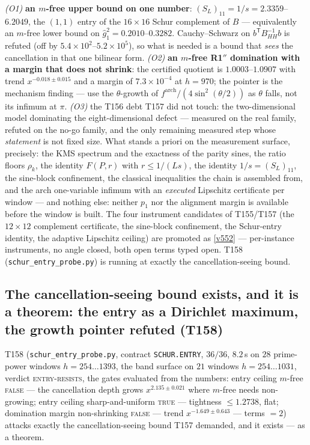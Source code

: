 \documentclass[11pt,a4paper]{article}
\begin{document}
\begin{keybox}
\emph{(O1)} \textbf{an $m$-free upper bound on one number}: $(S_L)_{11}=1/s=
2.3359$--$6.2049$, the $(1,1)$ entry of the $16\times16$ Schur complement of $B$ ---
equivalently an $m$-free lower bound on $\hat g_1^2=0.2010$--$0.3282$. Cauchy--Schwarz
on $b^{\mathsf T}B_{HH}^{-1}b$ is refuted (off by $5.4\times10^{2}$--$5.2\times10^{5}$),
so what is needed is a bound that \emph{sees} the cancellation in that one bilinear
form. \emph{(O2)} \textbf{an $m$-free R1$''$ domination with a margin that does not
shrink}: the certified quotient is $1.0003$--$1.0907$ with trend $x^{-0.018\pm0.015}$
and a margin of $7.3\times10^{-4}$ at $h=970$; the pointer is the mechanism finding ---
use the $\theta$-growth of $f^{\mathrm{arch}}/(4\sin^2(\theta/2))$ as $\theta$ falls,
not its infimum at $\pi$. \emph{(O3)} the T156 debt T157 did not touch: the
two-dimensional model dominating the eight-dimensional defect --- measured on the real
family, refuted on the no-go family, and the only remaining measured step whose
\emph{statement} is not fixed size. What stands a priori on the measurement surface,
precisely: the KMS spectrum and the exactness of the parity sines, the ratio floors
$\rho_k$, the identity $F(P,r)$ with $r\le1/(Ls)$, the identity $1/s=(S_L)_{11}$, the
sine-block confinement, the classical inequalities the chain is assembled from, and the
arch one-variable infimum with an \emph{executed} Lipschitz certificate per window ---
and nothing else: neither $p_1$ nor the alignment margin is available before the window
is built. The four instrument candidates of T155/T157 (the $12\times12$ complement
certificate, the sine-block confinement, the Schur-entry identity, the adaptive
Lipschitz ceiling) are promoted as \vref{v552} --- per-instance instruments, no angle
closed, both open terms typed open.
T158 (\texttt{schur\_entry\_probe.py}) is running at exactly the cancellation-seeing
bound.
\end{keybox}

\subsection{The cancellation-seeing bound exists, and it is a theorem: the entry as a
Dirichlet maximum, the growth pointer refuted (T158)}
T158 (\texttt{schur\_entry\_probe.py}, contract \texttt{SCHUR.ENTRY}, $36/36$,
$8.2$\,s on $28$ prime-power windows $h=254\ldots1393$, the band surface on $21$
windows $h=254\ldots1031$, verdict \textsc{entry-resists}, the gates evaluated from the
numbers: entry ceiling $m$-free \textsc{false} --- the cancellation depth grows
$x^{2.135\pm0.021}$ where $m$-free needs non-growing; entry ceiling sharp-and-uniform
\textsc{true} --- tightness $\le1.2738$, flat; domination margin non-shrinking
\textsc{false} --- trend $x^{-1.649\pm0.643}$ --- terms $=2$) attacks exactly the
cancellation-seeing bound T157 demanded, and it exists --- as a theorem.
\end{document}
